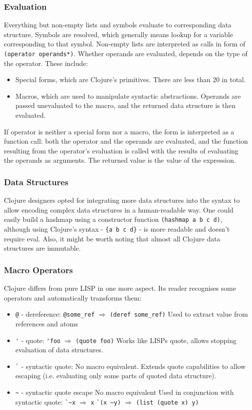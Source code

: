 \documentclass[11pt]{scrartcl}
\begin{document}
\subsubsection{Evaluation}
Everything but non-empty lists and symbols evaluate to corresponding data
structure.
Symbols are resolved, which generally means lookup for a variable corresponding
to that symbol.
Non-empty lists are interpreted as calls in form of \lstinline$(operator operands*)$.
Whether operands are evaluated, depends on the type of the operator.
These include:
\begin{itemize}
  \item Special forms, which are Clojure’s primitives. There are  less than 20
    in total.
  \item Macros, which are used to manipulate syntactic abstractions. Operands
    are passed unevaluated to the macro, and the returned data structure is then
    evaluated.
\end{itemize}
If operator is neither a special form nor a macro, the form is interpreted as a
function call: both the operator and the operands are evaluated, and the
function resulting from the operator’s evaluation is called with the results of
evaluating the operands as arguments.
The returned value is the value of the expression.

\subsubsection{Data Structures}
Clojure designers opted for integrating more data structures into the syntax to
allow encoding complex data structures in a human-readable way.
One could easily build a hashmap using a constructor function
\lstinline$(hashmap a b c d)$, although using Clojure’s syntax -
\lstinline${a b c d}$ - is more readable and doesn’t require eval.
Also, it might be worth noting that almost all Clojure data structures are
immutable.

\subsubsection{Macro Operators}
Clojure differs from pure LISP in one more aspect.
Its reader recognises some operators and automatically transforms them:
\begin{itemize}
  \item \lstinline|@| - dereference:
\lstinline|@some_ref| $\Rightarrow$ \lstinline|(deref some_ref)|
Used to extract value from references and atoms
  \item \lstinline|'| - quote:
\lstinline|'foo| $\Rightarrow$ \lstinline|(quote foo)|
Works like LISPs quote, allows stopping evaluation of data structures.
  \item \lstinline|`| - syntactic quote:
No macro equivalent.
Extends quote capabilities to allow escaping (i.e. evaluating only some parts of
quoted data structure).

  \item \lstinline|~| - syntactic quote escape
No macro equivalent
Used in conjunction with syntactic quote:
\lstinline|`~x| $\Rightarrow$ \lstinline|x|
\lstinline|`(x ~y)| $\Rightarrow$ \lstinline|(list (quote x) y)|
\end{itemize}
\end{document}
